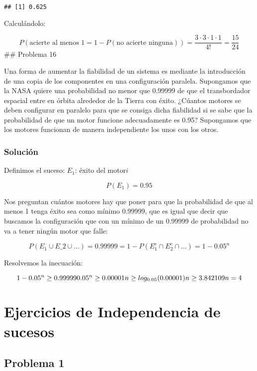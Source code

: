 \documentclass[
]{article}
\begin{document}
\begin{verbatim}
## [1] 0.625
\end{verbatim}

Calculándolo:

\[
P(\textrm{acierte al menos 1} = 1 - P(\textrm{no acierte ninguna})) = \frac{3\cdot 3 \cdot 1 \cdot 1}{4!} = \frac{15}{24}
\] \#\# Problema 16

Una forma de aumentar la fiabilidad de un sistema es mediante la
introducción de una copia de los componentes en una configuración
paralela. Supongamos que la NASA quiere una probabilidad no menor que
0.99999 de que el transbordador espacial entre en órbita alrededor de la
Tierra con éxito. ¿Cúantos motores se deben configurar en paralelo para
que se consiga dicha fiabilidad si se sabe que la probabilidad de que un
motor funcione adecuadamente es 0.95? Supongamos que los motores
funcionan de manera independiente los unos con los otros.

\hypertarget{soluciuxf3n-12}{%
\subsubsection{Solución}\label{soluciuxf3n-12}}

Definimos el suceso: \(E_1\): éxito del motor\(i\)

\[
P(E_1) = 0.95
\]

Nos preguntan cuántos motores hay que poner para que la probabilidad de
que al menos 1 tenga éxito sea como mínimo 0.99999, que es igual que
decir que buscamos la configuración que con un mínimo de un 0.99999 de
probabilidad no va a tener ningún motor que falle:

\[
P(E_1 \cup E\_2 \cup \dots) = 0.99999 = 1 - P(E_1^c \cap E_2^c \cap \dots) = 1 - 0.05^n
\]

Resolvemos la inecuación:

\[
1 - 0.05^n \geq 0.99999 \\
0.05^n \geq 0.00001 \\
n \geq log_{0.05}(0.00001) \\
n \geq 3.842109 \\
n = 4
\]

\hypertarget{ejercicios-de-independencia-de-sucesos}{%
\section{Ejercicios de Independencia de
sucesos}\label{ejercicios-de-independencia-de-sucesos}}

\hypertarget{problema-1}{%
\subsection{Problema 1}\label{problema-1}}
\end{document}
